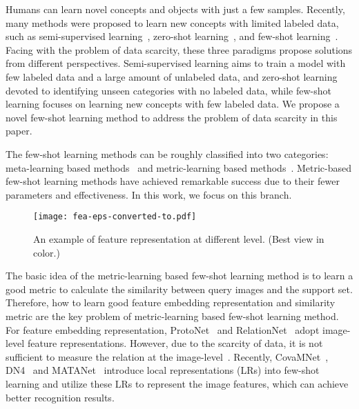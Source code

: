\documentclass[10pt,twocolumn,letterpaper]{article}
\begin{document}
Humans can learn novel concepts and objects with just a few samples. Recently, many methods were proposed to learn new concepts with limited labeled data, such as semi-supervised learning~\cite{cvpr0003CCL20,cvprWangKG0K20}, zero-shot learning~\cite{cvprWuZZLZW20,cvprYuJHZ20}, and few-shot learning~\cite{ravi2016optimization,finn2017model,snell2017prototypical,sung2018learning,li2019revisiting,simon2020adaptive,chen2020multi}. Facing with the problem of data scarcity, these three paradigms propose solutions from different perspectives. Semi-supervised learning aims to train a model with few labeled data and a large amount of unlabeled data, and zero-shot learning devoted to identifying unseen categories with no labeled data, while few-shot learning focuses on learning new concepts with few labeled data. We propose a novel few-shot learning method to address the problem of data scarcity in this paper.

The few-shot learning methods can be roughly classified into two categories: meta-learning based methods~\cite{ravi2016optimization,finn2017model,sun2019meta} and metric-learning based methods~\cite{snell2017prototypical,sung2018learning,li2019revisiting,simon2020adaptive,chen2020multi}. Metric-based few-shot learning methods have achieved remarkable success due to their fewer parameters and effectiveness. In this work, we focus on this branch.

\begin{figure}[t]
	\centering
	\texttt{[image: fea-eps-converted-to.pdf]}
	\caption{An example of feature representation at different level. (Best view in color.)}
\end{figure}

The basic idea of the metric-learning based few-shot learning method is to learn a good metric to calculate the similarity between query images and the support set. Therefore, how to learn good feature embedding representation and similarity metric are the key problem of metric-learning based few-shot learning method. For feature embedding representation, ProtoNet~\cite{snell2017prototypical} and RelationNet~\cite{sung2018learning} adopt image-level feature representations. However, due to the scarcity of data, it is not sufficient to measure the relation at the image-level~\cite{snell2017prototypical,sung2018learning}. Recently, CovaMNet~\cite{li2019distribution}, DN4~\cite{li2019revisiting} and MATANet~\cite{chen2020multi} introduce local representations (LRs) into few-shot learning and utilize these LRs to represent the image features, which can achieve better recognition results. 
\end{document}
